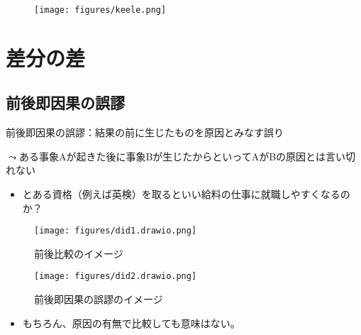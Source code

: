 \documentclass[
  xelatex,
  ja=standard]{bxjsarticle}
\providecommand{\tightlist}{%
  \setlength{\itemsep}{0pt}\setlength{\parskip}{0pt}}\usepackage{longtable,booktabs,array}
\begin{document}
\begin{figure}[htpb]

{\centering \texttt{[image: figures/keele.png]}

}

\caption{\citet{keele2015}}

\end{figure}

\hypertarget{ux5deeux5206ux306eux5dee}{%
\section{差分の差}\label{ux5deeux5206ux306eux5dee}}

\hypertarget{ux524dux5f8cux5373ux56e0ux679cux306eux8aa4ux8b2c}{%
\subsection{前後即因果の誤謬}\label{ux524dux5f8cux5373ux56e0ux679cux306eux8aa4ux8b2c}}

前後即因果の誤謬：結果の前に生じたものを原因とみなす誤り

\(\leadsto\)ある事象Aが起きた後に事象Bが生じたからといってAがBの原因とは言い切れない

\begin{itemize}
\tightlist
\item
  とある資格（例えば英検）を取るといい給料の仕事に就職しやすくなるのか？
\end{itemize}

\begin{figure}[htpb]

{\centering \texttt{[image: figures/did1.drawio.png]}

}

\caption{前後比較のイメージ}

\end{figure}

\begin{figure}[htpb]

{\centering \texttt{[image: figures/did2.drawio.png]}

}

\caption{前後即因果の誤謬のイメージ}

\end{figure}

\begin{itemize}
\tightlist
\item
  もちろん、原因の有無で比較しても意味はない。
\end{itemize}
\end{document}
